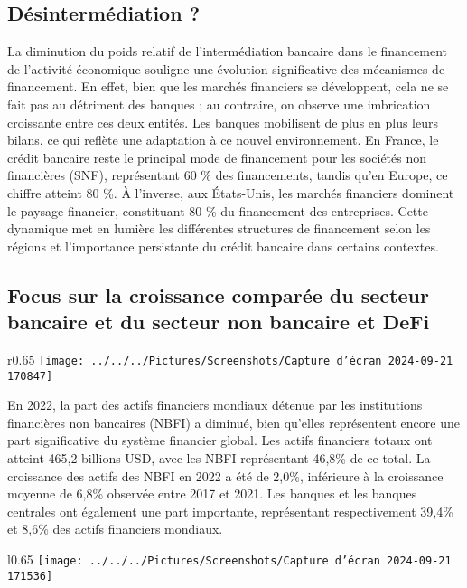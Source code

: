 \documentclass[a4paper, 12pt]{report}
\begin{document}
\subsection{Désintermédiation ?}

La diminution du poids relatif de l’intermédiation bancaire dans le financement de l'activité économique souligne une évolution significative des mécanismes de financement. En effet, bien que les marchés financiers se développent, cela ne se fait pas au détriment des banques ; au contraire, on observe une imbrication croissante entre ces deux entités. Les banques mobilisent de plus en plus leurs bilans, ce qui reflète une adaptation à ce nouvel environnement. En France, le crédit bancaire reste le principal mode de financement pour les sociétés non financières (SNF), représentant 60 \% des financements, tandis qu'en Europe, ce chiffre atteint 80 \%. À l'inverse, aux États-Unis, les marchés financiers dominent le paysage financier, constituant 80 \% du financement des entreprises. Cette dynamique met en lumière les différentes structures de financement selon les régions et l'importance persistante du crédit bancaire dans certains contextes.
\newpage
\subsection{Focus sur la croissance comparée du secteur bancaire et du secteur non bancaire et DeFi}

\begin{wrapfigure}{r}{0.65\textwidth}
	\centering
\texttt{[image: ../../../Pictures/Screenshots/Capture d'écran 2024-09-21 170847]}
\end{wrapfigure}

En 2022, la part des actifs financiers mondiaux détenue par les institutions financières non bancaires (NBFI) a diminué, bien qu'elles représentent encore une part significative du système financier global. Les actifs financiers totaux ont atteint 465,2 billions USD, avec les NBFI représentant 46,8\% de ce total. La croissance des actifs des NBFI en 2022 a été de 2,0\%, inférieure à la croissance moyenne de 6,8\% observée entre 2017 et 2021. Les banques et les banques centrales ont également une part importante, représentant respectivement 39,4\% et 8,6\% des actifs financiers mondiaux.

\begin{wrapfigure}{l}{0.65\textwidth}
	\centering
	\texttt{[image: ../../../Pictures/Screenshots/Capture d'écran 2024-09-21 171536]}
\end{wrapfigure}
\end{document}
